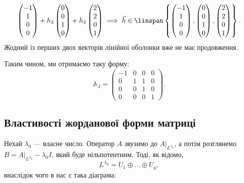 \documentclass{math_library}
\begin{document}
\begin{example}
\begin{itemize}[wide=0pt]
\[\begin{pmatrix}
-1 \\ 1 \\ 0 \\ 0
\end{pmatrix} + h_3 \begin{pmatrix}
0 \\ 0 \\ 1 \\ 0
\end{pmatrix} + h_4 \begin{pmatrix}
2 \\ 2 \\ 0 \\ 1 
\end{pmatrix} \implies \vec{h} \in \linspan \left\{ \begin{pmatrix}
-1 \\ 1 \\ 0 \\ 0
\end{pmatrix}, \begin{pmatrix}
0 \\ 0 \\ 1 \\ 0
\end{pmatrix}, \begin{pmatrix}
2 \\ 2 \\ 0 \\ 1
\end{pmatrix} \right\}.
\]
Жодний із перших двох векторів лінійної оболонки вже не має продовження.
\end{itemize}
Таким чином, ми отримаємо таку форму:
\[
\mathbb{A}_J = \begin{pmatrix}
-1 & 0 & 0 & 0 \\
0 & 1 & 1 & 0 \\
0 & 0 & 1 & 0 \\
0 & 0 & 0 & 1
\end{pmatrix}.
\]
\end{example}

\subsection{Властивості жорданової форми матриці}
Нехай $\lambda_0$ --- власне число. Оператор $A$ звузимо до $A|_{L^{\lambda_0}}$, а потім розглянемо $B = A|_{L^{\lambda_0}} - \lambda_0 I$, який буде нільпотентним. Тоді, як відомо,
\[
L^{\lambda_0} = U_1 \oplus \dots \oplus U_q, 
\]
внаслідок чого в нас є така діаграма:
\begin{figure}[H]
\centering
{}
\end{figure}
\end{document}

